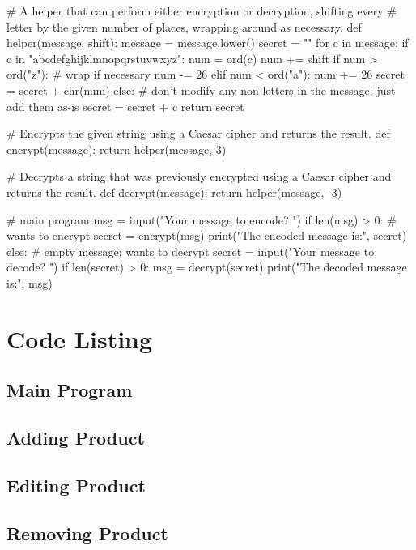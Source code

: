 \begin{python}
\begin{python}
# A helper that can perform either encryption or decryption, shifting every
# letter by the given number of places, wrapping around as necessary.
def helper(message, shift):
	message = message.lower()
	secret = ""
	for c in message:
		if c in "abcdefghijklmnopqrstuvwxyz":
			num = ord(c)
			num += shift
			if num > ord("z"):     # wrap if necessary
				num -= 26
			elif num < ord("a"):
				num += 26
			secret = secret + chr(num)
		else:
			# don't modify any non-letters in the message; just add them as-is
			secret = secret + c
	return secret

# Encrypts the given string using a Caesar cipher and returns the result.
def encrypt(message):
	return helper(message, 3)

# Decrypts a string that was previously encrypted using a Caesar cipher and returns the result.
def decrypt(message):
	return helper(message, -3)


# main program
msg = input("Your message to encode? ")
if len(msg) > 0:
	# wants to encrypt
	secret = encrypt(msg)
	print("The encoded message is:", secret)
else:
	# empty message; wants to decrypt
	secret = input("Your message to decode? ")
	if len(secret) > 0:
		msg = decrypt(secret)
		print("The decoded message is:", msg)

\end{python}


\pagebreak

\section{Code Listing}


\subsection{Main Program}
\pagebreak

\subsection{Adding Product}
\pagebreak


\subsection{Editing Product}
\pagebreak

\subsection{Removing Product}
\pagebreak


\end{python}
